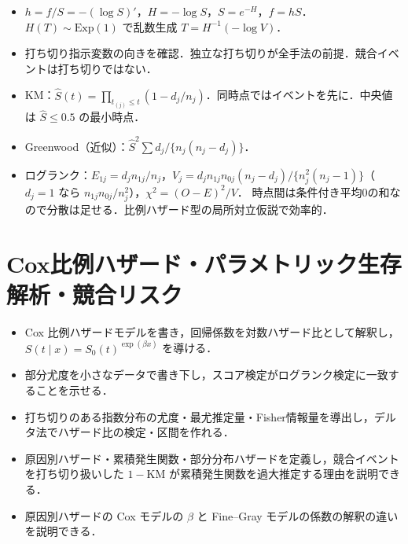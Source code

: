 \documentclass[a4paper,11pt,openany]{ltjsbook}
\newcommand{\Ex}{\mathrm{Exp}}
\begin{document}
\begin{summarybox}
\begin{itemize}
\item $h=f/S=-(\log S)'$，$H=-\log S$，$S=e^{-H}$，$f=hS$．$H(T)\sim\Ex(1)$ で乱数生成 $T=H^{-1}(-\log V)$．
\item 打ち切り指示変数の向きを確認．独立な打ち切りが全手法の前提．競合イベントは打ち切りではない．
\item KM：$\hat S(t)=\prod_{t_{(j)}\le t}(1-d_j/n_j)$．同時点ではイベントを先に．中央値は $\hat S\le0.5$ の最小時点．
\item Greenwood（近似）：$\hat S^2\sum d_j/\{n_j(n_j-d_j)\}$．
\item ログランク：$E_{1j}=d_jn_{1j}/n_j$，$V_j=d_jn_{1j}n_{0j}(n_j-d_j)/\{n_j^2(n_j-1)\}$（$d_j=1$ なら $n_{1j}n_{0j}/n_j^2$），$\chi^2=(O-E)^2/V$．
      時点間は条件付き平均0の和なので分散は足せる．比例ハザード型の局所対立仮説で効率的．
\end{itemize}
\end{summarybox}

\chapter[Cox比例ハザード・パラメトリック生存解析・競合リスク]{Cox比例ハザード・パラメトリック生存解析・競合リスク}\label{ch:10}

\begin{goalbox}
\begin{itemize}
\item Cox 比例ハザードモデルを書き，回帰係数を対数ハザード比として解釈し，$S(t\mid x)=S_0(t)^{\exp(\beta x)}$ を導ける．
\item 部分尤度を小さなデータで書き下し，スコア検定がログランク検定に一致することを示せる．
\item 打ち切りのある指数分布の尤度・最尤推定量・Fisher情報量を導出し，デルタ法でハザード比の検定・区間を作れる．
\item 原因別ハザード・累積発生関数・部分分布ハザードを定義し，競合イベントを打ち切り扱いした $1-\mathrm{KM}$ が累積発生関数を過大推定する理由を説明できる．
\item 原因別ハザードの Cox モデルの $\beta$ と Fine--Gray モデルの係数の解釈の違いを説明できる．
\end{itemize}
\end{goalbox}
\end{document}
